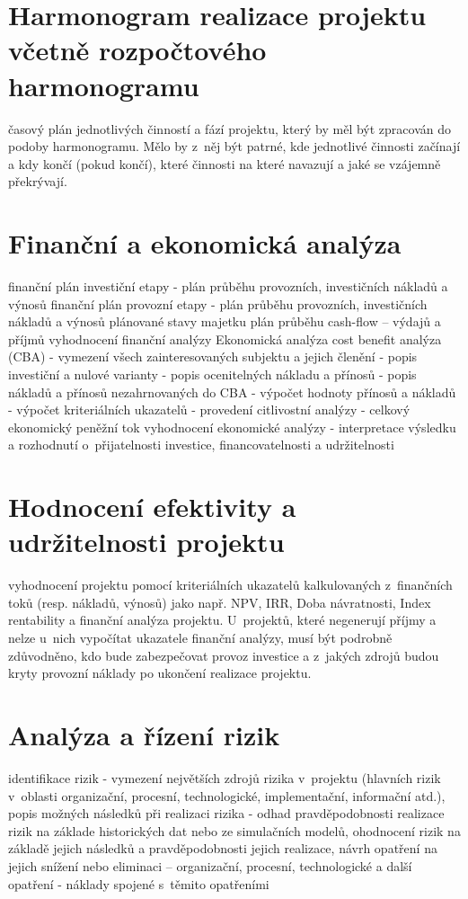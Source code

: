 \documentclass[
	12pt, oneside, printed, final, 
	table,   %
	lof,     %
	lot     %
]{fithesis3}
\begin{document}
{\section{Harmonogram realizace projektu včetně rozpočtového harmonogramu}

časový plán jednotlivých činností a fází projektu, který by měl být zpracován do
podoby harmonogramu. Mělo by z~něj být patrné, kde jednotlivé činnosti začínají a
kdy končí (pokud končí), které činnosti na které navazují a jaké se vzájemně
překrývají.

\section{Finanční a ekonomická analýza }

finanční plán investiční etapy
- plán průběhu provozních, investičních nákladů a výnosů
finanční plán provozní etapy
- plán průběhu provozních, investičních nákladů a výnosů
plánované stavy majetku
plán průběhu cash-flow – výdajů a příjmů
vyhodnocení finanční analýzy
Ekonomická analýza
cost benefit analýza (CBA)
- vymezení všech zainteresovaných subjektu a jejich členění
- popis investiční a nulové varianty
- popis ocenitelných nákladu a přínosů
- popis nákladů a přínosů nezahrnovaných do CBA
- výpočet hodnoty přínosů a nákladů
- výpočet kriteriálních ukazatelů
- provedení citlivostní analýzy
- celkový ekonomický peněžní tok
vyhodnocení ekonomické analýzy
- interpretace výsledku a rozhodnutí o~přijatelnosti investice,
financovatelnosti a udržitelnosti

\section{Hodnocení efektivity a udržitelnosti projektu}

vyhodnocení projektu pomocí kriteriálních ukazatelů kalkulovaných z~finančních toků
(resp. nákladů, výnosů) jako např. NPV, IRR, Doba návratnosti, Index rentability a
finanční analýza projektu. U~projektů, které negenerují příjmy a nelze u~nich vypočítat
ukazatele finanční analýzy, musí být podrobně zdůvodněno, kdo bude zabezpečovat 
provoz investice a z~jakých zdrojů budou kryty provozní náklady po ukončení
realizace projektu.

\section{Analýza a řízení rizik}

identifikace rizik - vymezení největších zdrojů rizika v~projektu (hlavních rizik
v~oblasti organizační, procesní, technologické, implementační, informační atd.),
popis možných následků při realizaci rizika
- odhad pravděpodobnosti realizace rizik na základe historických dat nebo ze
simulačních modelů, ohodnocení rizik na základě jejich následků a pravděpodobnosti
jejich realizace, návrh opatření na jejich snížení nebo eliminaci – organizační,
procesní, technologické a další opatření
- náklady spojené s~těmito opatřeními

}
\end{document}
